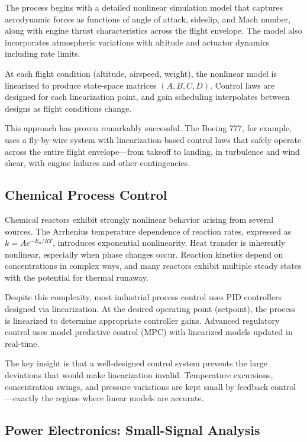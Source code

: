 The process begins with a detailed nonlinear simulation model that captures aerodynamic forces as functions of angle of attack, sideslip, and Mach number, along with engine thrust characteristics across the flight envelope. The model also incorporates atmospheric variations with altitude and actuator dynamics including rate limits.

At each flight condition (altitude, airspeed, weight), the nonlinear model is linearized to produce state-space matrices $(A, B, C, D)$. Control laws are designed for each linearization point, and gain scheduling interpolates between designs as flight conditions change.

This approach has proven remarkably successful. The Boeing 777, for example, uses a fly-by-wire system with linearization-based control laws that safely operate across the entire flight envelope---from takeoff to landing, in turbulence and wind shear, with engine failures and other contingencies.

\subsection{Chemical Process Control}

Chemical reactors exhibit strongly nonlinear behavior arising from several sources. The Arrhenius temperature dependence of reaction rates, expressed as $k = A e^{-E_a/RT}$, introduces exponential nonlinearity. Heat transfer is inherently nonlinear, especially when phase changes occur. Reaction kinetics depend on concentrations in complex ways, and many reactors exhibit multiple steady states with the potential for thermal runaway.

Despite this complexity, most industrial process control uses PID controllers designed via linearization. At the desired operating point (setpoint), the process is linearized to determine appropriate controller gains. Advanced regulatory control uses model predictive control (MPC) with linearized models updated in real-time.

The key insight is that a well-designed control system prevents the large deviations that would make linearization invalid. Temperature excursions, concentration swings, and pressure variations are kept small by feedback control---exactly the regime where linear models are accurate.

\subsection{Power Electronics: Small-Signal Analysis}

